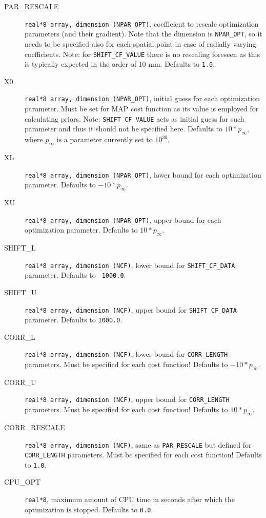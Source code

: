 \begin{description}
  \item[PAR\_RESCALE] {\tt real*8 array, dimension (NPAR\_OPT)}, coefficient to rescale optimization parameters (and their gradient). Note that the dimension is {\tt NPAR\_OPT}, so it needs to be specified also for each spatial point in case of radially varying coefficients. Note: for {\tt SHIFT\_CF\_VALUE} there is no rescaling foreseen as this is typically expected in the order of 10 mm. Defaults to {\tt 1.0}.
  \item[X0] {\tt real*8 array, dimension (NPAR\_OPT)}, initial guess for each optimization parameter. Must be set for MAP cost function as its value is employed for calculating priors. Note: {\tt SHIFT\_CF\_VALUE} acts as initial guess for such parameter and thus it should not be specified here. Defaults to $10*p_\infty$, where $p_\infty$ is a parameter currently set to $10^{30}$.
  \item[XL] {\tt real*8 array, dimension (NPAR\_OPT)}, lower bound for each optimization parameter. Defaults to $-10*p_\infty$.
  \item[XU] {\tt real*8 array, dimension (NPAR\_OPT)}, upper bound for each optimization parameter. Defaults to $10*p_\infty$.
  \item[SHIFT\_L] {\tt real*8 array, dimension (NCF)}, lower bound for {\tt SHIFT\_CF\_DATA} parameter. Defaults to {\tt -1000.0}.
  \item[SHIFT\_U] {\tt real*8 array, dimension (NCF)}, upper bound for {\tt SHIFT\_CF\_DATA} parameter. Defaults to {\tt 1000.0}.
  \item[CORR\_L] {\tt real*8 array, dimension (NCF)}, lower bound for {\tt CORR\_LENGTH} parameters. Must be specified for each cost function! Defaults to $-10*p_\infty$.
  \item[CORR\_U] {\tt real*8 array, dimension (NCF)}, upper bound for {\tt CORR\_LENGTH} parameters. Must be specified for each cost function! Defaults to $10*p_\infty$.
  \item[CORR\_RESCALE] {\tt real*8 array, dimension (NCF)}, same as {\tt PAR\_RESCALE} but defined for {\tt CORR\_LENGTH} parameters. Must be specified for each cost function! Defaults to  {\tt 1.0}.
  \item[CPU\_OPT] {\tt real*8}, maximum amount of CPU time in seconds after which the optimization is stopped. Defaults to {\tt 0.0}.

\end{description}

